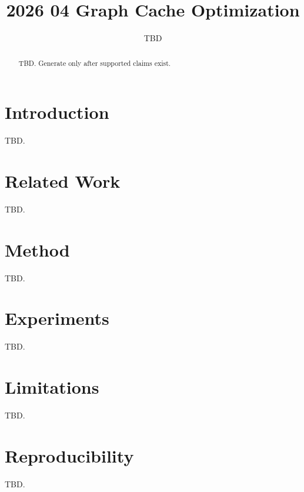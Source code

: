 \documentclass{article}
\begin{document}
\title{2026 04 Graph Cache Optimization}
\author{TBD}
\maketitle

\begin{abstract}
TBD. Generate only after supported claims exist.
\end{abstract}

\section{Introduction}
TBD.

\section{Related Work}
TBD.

\section{Method}
TBD.

\section{Experiments}
TBD.

\section{Limitations}
TBD.

\section{Reproducibility}
TBD.
\end{document}
